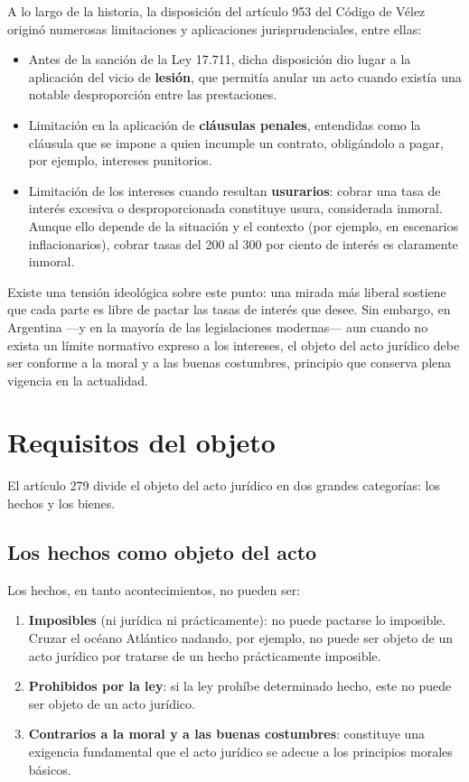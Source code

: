 \documentclass[12pt,oneside]{book}
\begin{document}
\begin{note}
A lo largo de la historia, la disposición del artículo 953 del Código de Vélez originó numerosas limitaciones y aplicaciones jurisprudenciales, entre ellas:
\begin{itemize}
    \item Antes de la sanción de la Ley 17.711, dicha disposición dio lugar a la aplicación del vicio de \textbf{lesión}, que permitía anular un acto cuando existía una notable desproporción entre las prestaciones.
    \item Limitación en la aplicación de \textbf{cláusulas penales}, entendidas como la cláusula que se impone a quien incumple un contrato, obligándolo a pagar, por ejemplo, intereses punitorios.
    \item Limitación de los intereses cuando resultan \textbf{usurarios}: cobrar una tasa de interés excesiva o desproporcionada constituye usura, considerada inmoral. Aunque ello depende de la situación y el contexto (por ejemplo, en escenarios inflacionarios), cobrar tasas del 200 al 300 por ciento de interés es claramente inmoral.
\end{itemize}
\end{note}

Existe una tensión ideológica sobre este punto: una mirada más liberal sostiene que cada parte es libre de pactar las tasas de interés que desee. Sin embargo, en Argentina —y en la mayoría de las legislaciones modernas— aun cuando no exista un límite normativo expreso a los intereses, el objeto del acto jurídico debe ser conforme a la moral y a las buenas costumbres, principio que conserva plena vigencia en la actualidad.

\section{Requisitos del objeto}

El artículo 279 divide el objeto del acto jurídico en dos grandes categorías: los hechos y los bienes.

\subsection{Los hechos como objeto del acto}

Los hechos, en tanto acontecimientos, no pueden ser:

\begin{enumerate}
    \item \textbf{Imposibles} (ni jurídica ni prácticamente): no puede pactarse lo imposible. Cruzar el océano Atlántico nadando, por ejemplo, no puede ser objeto de un acto jurídico por tratarse de un hecho prácticamente imposible.
    \item \textbf{Prohibidos por la ley}: si la ley prohíbe determinado hecho, este no puede ser objeto de un acto jurídico.
    \item \textbf{Contrarios a la moral y a las buenas costumbres}: constituye una exigencia fundamental que el acto jurídico se adecue a los principios morales básicos.
\end{enumerate}
\end{document}
